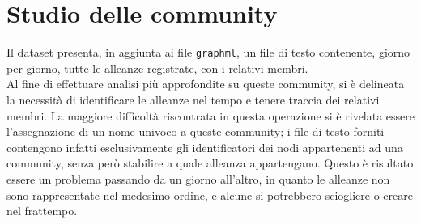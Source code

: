 \section{Studio delle community}
Il dataset presenta, in aggiunta ai file \texttt{graphml}, un file di testo contenente, giorno per giorno, tutte le alleanze registrate, con i relativi membri.\\
Al fine di effettuare analisi più approfondite su queste community, si è delineata la necessità di identificare le alleanze nel tempo e tenere traccia dei relativi membri.
La maggiore difficoltà riscontrata in questa operazione si è rivelata essere l'assegnazione di un nome univoco a queste community; i file di testo forniti contengono infatti esclusivamente gli identificatori dei nodi appartenenti ad una community, senza però stabilire a quale alleanza appartengano.
Questo è risultato essere un problema passando da un giorno all'altro, in quanto le alleanze non sono rappresentate nel medesimo ordine, e alcune si potrebbero sciogliere o creare nel frattempo.
